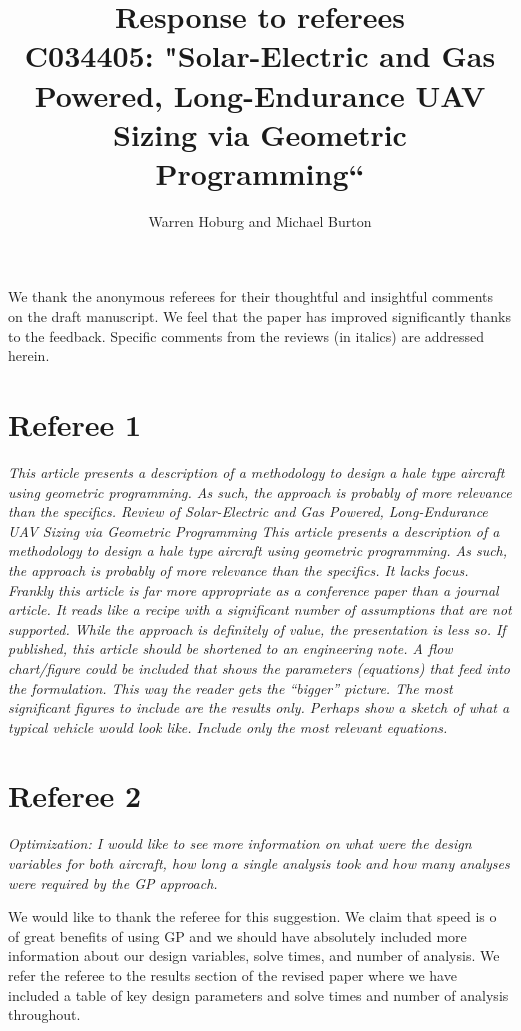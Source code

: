 \documentclass[10pt, a4paper]{article}
\begin{document}
\title{Response to referees \\
C034405: "Solar-Electric and Gas Powered, Long-Endurance UAV Sizing via Geometric Programming``}
\author{Warren Hoburg and Michael Burton}
\maketitle

We thank the anonymous referees for their thoughtful and insightful comments on the draft manuscript.
We feel that the paper has improved significantly thanks to the feedback. 
Specific comments from the reviews (in italics) are addressed herein.

\section*{Referee 1}

\emph{
This article presents a description of a methodology to design a hale type aircraft using geometric programming.
As such, the approach is probably of more relevance than the specifics.
Review of Solar-Electric and Gas Powered, Long-Endurance UAV Sizing via Geometric Programming
This article presents a description of a methodology to design a hale type aircraft using geometric programming.
As such, the approach is probably of more relevance than the specifics.
It lacks focus. Frankly this article is far more appropriate as a conference paper than a journal article. It reads like a recipe with a significant number of assumptions that are not supported.
While the approach is definitely of value, the presentation is less so. If published, this article should be shortened to an engineering note. 
A flow chart/figure could be included that shows the parameters (equations) that feed into the formulation. This way the reader gets the “bigger” picture. 
The most significant figures to include are the results only. 
Perhaps show a sketch of what a typical vehicle would look like. 
Include only the most relevant equations.
}

\section*{Referee 2}

\emph{Optimization: I would like to see more information on what were the design variables for both aircraft, how long a single analysis took and how many analyses were required by the GP approach.}

We would like to thank the referee for this suggestion.  We claim that speed is o of great benefits of using GP and we should have absolutely included more information about our design variables, solve times, and number of analysis.  We refer the referee to the results section of the revised paper where we have included a table of key design parameters and solve times and number of analysis throughout. 
\end{document}
